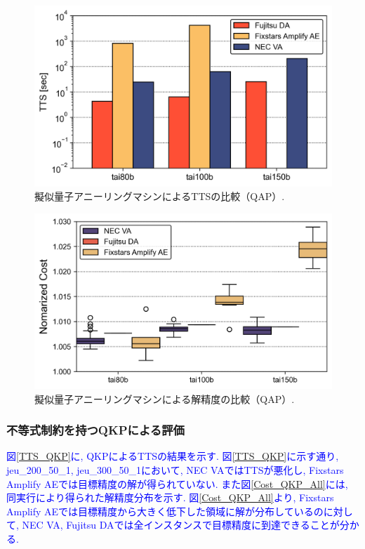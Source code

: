 \documentclass[submit,techrep,noauthor]{ipsj}
\begin{document}
\begin{figure}[ht]
\centering
\includegraphics[bb=0 0 700 230, width=15cm]{TTS_QAP.png}
\caption{擬似量子アニーリングマシンによるTTSの比較（QAP）.}
\label{TTS_QAP}
\end{figure}

\begin{figure}[ht]
\centering
\includegraphics[bb=0 0 700 230, width=15cm]{speed_vs_constraint_QAP.png}
\caption{擬似量子アニーリングマシンによる解精度の比較（QAP）.}
\label{QAP_speed_vs_const}
\end{figure}

\subsubsection{不等式制約を持つQKPによる評価}
\textcolor{blue}{図\ref{TTS_QKP}に, QKPによるTTSの結果を示す. 図\ref{TTS_QKP}に示す通り, jeu\_200\_50\_1, jeu\_300\_50\_1において, NEC VAではTTSが悪化し, Fixstars Amplify AEでは目標精度の解が得られていない. また図\ref{Cost_QKP_All}には, 同実行により得られた解精度分布を示す. 図\ref{Cost_QKP_All}より, Fixstars Amplify AEでは目標精度から大きく低下した領域に解が分布しているのに対して, NEC VA, Fujitsu DAでは全インスタンスで目標精度に到達できることが分かる.}
\end{document}
